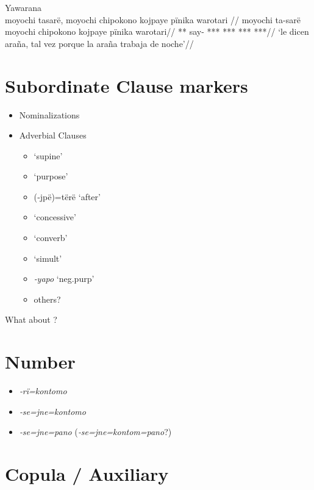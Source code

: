 \documentclass{memoir}
\begin{document}
\ex Yawarana \\
\label{ctoaragrme-25}    \begingl
    \glpreamble  moyochi tasarë, moyochi chipokono kojpaye pïnika warotari //
    \gla moyochi ta-sarë moyochi chipokono kojpaye pïnika warotari//
    \glb *** say- *** *** ***  ***//
        \glft ‘le dicen araña, tal vez porque la araña trabaja de noche’//  
    \endgl 
\xe

\section{Subordinate Clause markers}

\begin{itemize}
\tightlist
\item
  Nominalizations
\item
  Adverbial Clauses

  \begin{itemize}
  \tightlist
  \item
     `supine'
  \item
     `purpose'
  \item
    (‑jpë)=tërë `after'
  \item
     `concessive'
  \item
     `converb'
  \item
     `simult'
  \item
    \emph{‑yapo} `neg.purp'
  \item
    others?
  \end{itemize}
\end{itemize}

What about ?

\section{Number}

\begin{itemize}
\tightlist
\item
  \emph{‑rï=kontomo}
\item
  \emph{‑se=jne=kontomo}
\item
  \emph{‑se=jne=pano} (\emph{‑se=jne=kontom=pano}?)
\end{itemize}

\section{Copula / Auxiliary}
\end{document}

